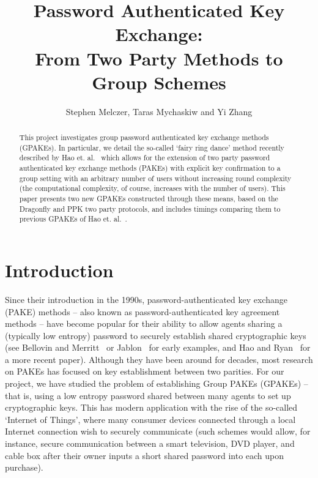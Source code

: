 \documentclass{amsart}
\author{Stephen Melczer, Taras Mychaskiw and Yi Zhang}
\title{Password Authenticated Key Exchange:\\ From Two Party Methods to Group Schemes}
\theoremstyle{remark}
\begin{document}
\begin{abstract}
This project investigates group password authenticated key exchange methods (GPAKEs).  In 
particular, we detail the so-called `fairy ring dance' method recently described by 
Hao et. al.~\cite{HaYiChSh15} which allows for the extension of two party password authenticated key exchange 
methods (PAKEs) with explicit key confirmation to a group setting with an arbitrary number of users without
increasing round complexity (the computational complexity, of course, increases with the number of users).  
This paper presents two new GPAKEs constructed through these means, based on the 
Dragonfly and PPK two party protocols, and includes timings comparing them to previous GPAKEs of
Hao et. al.~\cite{HaYiChSh15}.
\end{abstract}

\maketitle


\section{Introduction}

Since their introduction in the 1990s, password-authenticated key exchange (PAKE) methods -- 
also known as password-authenticated key agreement methods -- have become popular for their 
ability to allow agents sharing a (typically low entropy) password to securely establish shared 
cryptographic keys (see Bellovin and Merritt~\cite{BeMe92} or Jablon~\cite{Ja96} for early examples, 
and Hao and Ryan~\cite{HaRy2010} for a more recent paper).  Although they have been around for decades, 
most research on PAKEs has focused on key establishment between two parities.  For our project, we 
have studied the problem of establishing Group PAKEs (GPAKEs) -- that is, using a low entropy password 
shared between many agents to set up cryptographic keys.  This has modern application with the rise
of the so-called `Internet of Things', where many consumer devices connected through a local Internet 
connection wish to securely communicate (such schemes would allow, for instance, secure communication 
between a smart television, DVD player, and cable box after their owner inputs a short shared password 
into each upon purchase).
\\
\end{document}

